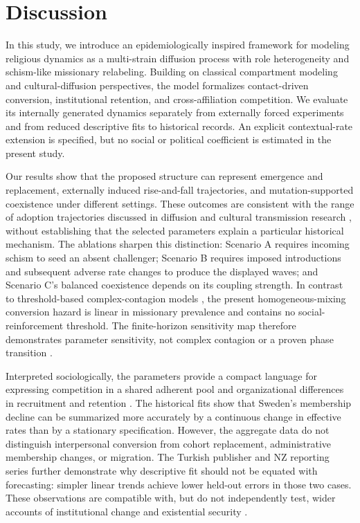 \documentclass[11pt,a4paper]{article}
\begin{document}
\section{Discussion}
\label{sec:dicussion}
In this study, we introduce an epidemiologically inspired framework for modeling religious dynamics as a multi-strain diffusion process with role heterogeneity and schism-like missionary relabeling. Building on classical compartment modeling and cultural-diffusion perspectives, the model formalizes contact-driven conversion, institutional retention, and cross-affiliation competition. We evaluate its internally generated dynamics separately from externally forced experiments and from reduced descriptive fits to historical records. An explicit contextual-rate extension is specified, but no social or political coefficient is estimated in the present study.

Our results show that the proposed structure can represent emergence and replacement, externally induced rise-and-fall trajectories, and mutation-supported coexistence under different settings. These outcomes are consistent with the range of adoption trajectories discussed in diffusion and cultural transmission research \cite{rogers2003diffusion,cavalliSforzaFeldman1981cultural,boydRicherson1985culture}, without establishing that the selected parameters explain a particular historical mechanism. The ablations sharpen this distinction: Scenario A requires incoming schism to seed an absent challenger; Scenario B requires imposed introductions and subsequent adverse rate changes to produce the displayed waves; and Scenario C's balanced coexistence depends on its coupling strength. In contrast to threshold-based complex-contagion models \cite{centolaMacy2007complex,reisinger2024patterns}, the present homogeneous-mixing conversion hazard is linear in missionary prevalence and contains no social-reinforcement threshold. The finite-horizon sensitivity map therefore demonstrates parameter sensitivity, not complex contagion or a proven phase transition \cite{fullsack2021regime}.

Interpreted sociologically, the parameters provide a compact language for expressing competition in a shared adherent pool and organizational differences in recruitment and retention \cite{iannaccone1991market}. The historical fits show that Sweden's membership decline can be summarized more accurately by a continuous change in effective rates than by a stationary specification. However, the aggregate data do not distinguish interpersonal conversion from cohort replacement, administrative membership changes, or migration. The Turkish publisher and NZ reporting series further demonstrate why descriptive fit should not be equated with forecasting: simpler linear trends achieve lower held-out errors in those two cases. These observations are compatible with, but do not independently test, wider accounts of institutional change and existential security \cite{berger1967sacredcanopy,norrisInglehart2012sacred,gore2018forecasting}.
\end{document}
